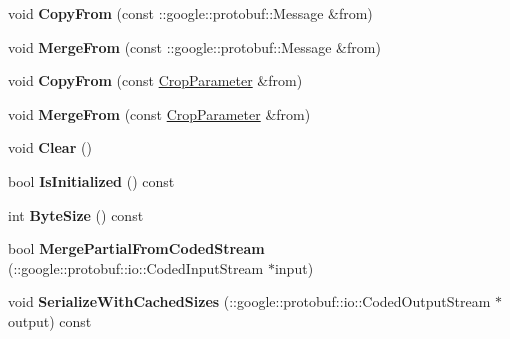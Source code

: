 \begin{DoxyCompactItemize}
\item 
\mbox{\label{classcaffe_1_1_crop_parameter_a1fea2c328b7baa6a2c37e207ad795fbd}} 
void {\bfseries Copy\+From} (const \+::google\+::protobuf\+::\+Message \&from)
\item 
\mbox{\label{classcaffe_1_1_crop_parameter_adeecd874c28b6d75f7a8d5709d984168}} 
void {\bfseries Merge\+From} (const \+::google\+::protobuf\+::\+Message \&from)
\item 
\mbox{\label{classcaffe_1_1_crop_parameter_a8040b684e6673dbd54db1c2e77e29707}} 
void {\bfseries Copy\+From} (const \mbox{\hyperlink{classcaffe_1_1_crop_parameter}{Crop\+Parameter}} \&from)
\item 
\mbox{\label{classcaffe_1_1_crop_parameter_a7088e95e135b3d0d20e9f0813e966b0e}} 
void {\bfseries Merge\+From} (const \mbox{\hyperlink{classcaffe_1_1_crop_parameter}{Crop\+Parameter}} \&from)
\item 
\mbox{\label{classcaffe_1_1_crop_parameter_a457d5c467682ca7a7873f842148a385c}} 
void {\bfseries Clear} ()
\item 
\mbox{\label{classcaffe_1_1_crop_parameter_a79102b6d82fe80791e7763422ae2838c}} 
bool {\bfseries Is\+Initialized} () const
\item 
\mbox{\label{classcaffe_1_1_crop_parameter_a116238ffb859415744fa78220c184d85}} 
int {\bfseries Byte\+Size} () const
\item 
\mbox{\label{classcaffe_1_1_crop_parameter_a22edf20a56034abc979257df498d38a0}} 
bool {\bfseries Merge\+Partial\+From\+Coded\+Stream} (\+::google\+::protobuf\+::io\+::\+Coded\+Input\+Stream $\ast$input)
\item 
\mbox{\label{classcaffe_1_1_crop_parameter_adefd7ef3b91e6004cdf2b496d2d5460b}} 
void {\bfseries Serialize\+With\+Cached\+Sizes} (\+::google\+::protobuf\+::io\+::\+Coded\+Output\+Stream $\ast$output) const
\item 

\end{DoxyCompactItemize}
